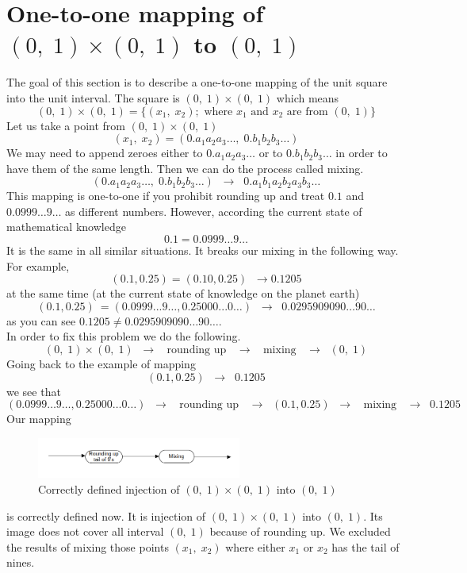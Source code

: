 \documentclass[color=black,11pt]{elegantpaper}
\begin{document}
\section{One-to-one mapping of $(0,\;1)\times (0,\;1)$ to $(0,\;1)$}
The goal of this section is to describe a one-to-one mapping of the unit square into the unit interval. The square is $(0,\; 1)\times (0,\;1)$ which means
$$
(0,\; 1)\times (0,\;1) =\{ (x_1,\;x_2); \mbox{ where } x_1 \mbox{ and } x_2 \mbox{ are from } (0,\;1)\} 
$$
Let us take a point from $(0,\; 1)\times (0,\;1)$
$$
(x_1,\;x_2) = (0.a_1a_2a_3\dots,\;0.b_1b_2b_3\dots)
$$
We may need to append zeroes either to $0.a_1a_2a_3\dots$ or to $0.b_1b_2b_3\dots$ in order to have them of the same length. Then we can do the process called mixing.
$$
(0.a_1a_2a_3\dots,\;0.b_1b_2b_3\dots) \;\; \rightarrow \;\; 0.a_1b_1a_2b_2a_3b_3\dots
$$
This mapping is one-to-one if you prohibit rounding up and treat $0.1$ and $0.0999\dots 9\dots$ as different numbers. However, according the current state of mathematical knowledge
$$
0.1 = 0.0999\dots 9\dots
$$
It is the same in all similar situations. It breaks our mixing in the following way.\\
For example,
$$
(0.1, 0.25) = (0.10,0.25) \;\; \rightarrow   0.1205
$$
at the same time (at the current state of knowledge on the planet earth)
$$
(0.1, 0.25) \ = (0.0999...9{\dots}, 0.25000...0{\dots})\;\; \rightarrow \;\; 0.0295909090\dots 90\dots
$$
as you can see $ 0.1205 \neq 0.0295909090{\dots} 90{\dots}.$\\
In order to fix this problem we do the following.
$$
 (0,\;1) \times (0,\;1)  \;\;\rightarrow \;\; \mbox{ rounding up }  \;\;\rightarrow \;\;  \mbox{ mixing } \;\;\rightarrow \;\; (0,\;1)
$$
Going back to the example of mapping
$$
(0.1, 0.25)  \;\;\rightarrow \;\; 0.1205
$$
we see that 
$$
(0.0999{\dots}9{\dots}, 0.25000{\dots}0{\dots}) \;\;\rightarrow \;\; \mbox{ rounding up }  \;\;\rightarrow \;\; (0.1, 0.25) \;\;\rightarrow \;\;  \mbox{ mixing } \;\;\rightarrow \;\; 0.1205
$$
Our mapping
\begin{figure}[htbp]
  \centering
  \includegraphics[width=0.6\textwidth]{image/Round_up_mixing.png}
  \caption{Correctly defined injection of $(0,\;1)\times (0,\;1)$ into  $(0,\;1)$}
  \label{fig:distance_point_plane}
\end{figure}
is correctly defined now. It is injection of $(0,\;1)\times (0,\;1)$ into  $(0,\;1).$ Its image does not cover all interval $(0,\;1)$ because of rounding up. We excluded the results of mixing those points $(x_1,\;x_2)$ where either $x_1$ or $x_2$ has the tail of nines.\\
\end{document}
